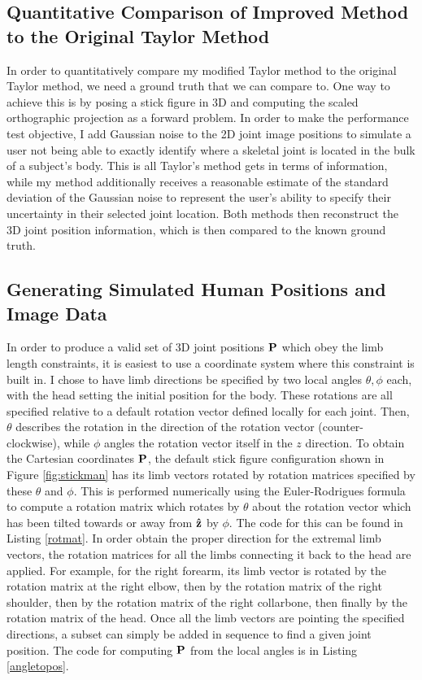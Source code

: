\documentclass[final]{article}
\begin{document}
\begin{spacing}{1.1}
\newpage
\section{Quantitative Comparison of Improved Method to the Original Taylor Method}

In order to quantitatively compare my modified Taylor method to the original Taylor method, we need a ground truth that we can compare to. One way to achieve this is by posing a stick figure in 3D and computing the scaled orthographic projection as a forward problem. In order to make the performance test objective, I add Gaussian noise to the 2D joint image positions to simulate a user not being able to exactly identify where a skeletal joint is located in the bulk of a subject's body. This is all Taylor's method gets in terms of information, while my method additionally receives a reasonable estimate of the standard deviation of the Gaussian noise to represent the user's ability to specify their uncertainty in their selected joint location. Both methods then reconstruct the 3D joint position information, which is then compared to the known ground truth.

\subsection{Generating Simulated Human Positions and Image Data}

In order to produce a valid set of 3D joint positions $\vb{P}$ which obey the limb length constraints, it is easiest to use a coordinate system where this constraint is built in. I chose to have limb directions be specified by two local angles $\theta,\phi$ each, with the head setting the initial position for the body. These rotations are all specified relative to a default rotation vector defined locally for each joint. Then, $\theta$ describes the rotation in the direction of the rotation vector (counter-clockwise), while $\phi$ angles the rotation vector itself in the $z$ direction. To obtain the Cartesian coordinates $\vb{P}$, the default stick figure configuration shown in Figure \ref{fig:stickman} has its limb vectors rotated by rotation matrices specified by these $\theta$ and $\phi$. This is performed numerically using the Euler-Rodrigues formula to compute a rotation matrix which rotates by $\theta$ about the rotation vector which has been tilted towards or away from $\vu{z}$ by $\phi$. The code for this can be found in Listing \ref{rotmat}. In order obtain the proper direction for the extremal limb vectors, the rotation matrices for all the limbs connecting it back to the head are applied. For example, for the right forearm, its limb vector is rotated by the rotation matrix at the right elbow, then by the rotation matrix of the right shoulder, then by the rotation matrix of the right collarbone, then finally by the rotation matrix of the head. Once all the limb vectors are pointing the specified directions, a subset can simply be added in sequence to find a given joint position. The code for computing $\vb{P}$ from the local angles is in Listing \ref{angletopos}.


\end{spacing}
\end{document}
